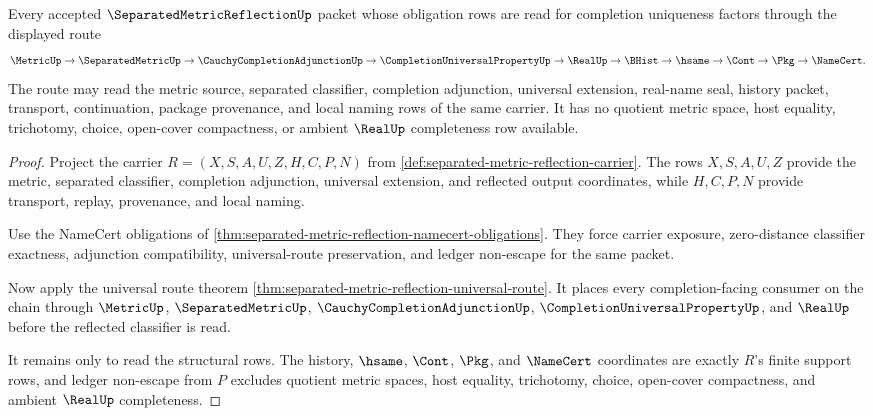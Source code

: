 \begin{theorem}
\label{thm:separated-metric-reflection-scope}
Every accepted $\SeparatedMetricReflectionUp$ packet whose obligation rows are read for completion uniqueness factors through the displayed route
$$
\MetricUp\to\SeparatedMetricUp\to\CauchyCompletionAdjunctionUp\to\CompletionUniversalPropertyUp\to\RealUp\to\BHist\to\hsame\to\Cont\to\Pkg\to\NameCert .
$$
The route may read the metric source, separated classifier, completion adjunction, universal extension, real-name seal, history packet, transport, continuation, package provenance, and local naming rows of the same carrier. It has no quotient metric space, host equality, trichotomy, choice, open-cover compactness, or ambient $\RealUp$ completeness row available.
\end{theorem}
\begin{proof}
Project the carrier $R=(X,S,A,U,Z,H,C,P,N)$ from \autoref{def:separated-metric-reflection-carrier}. The rows $X,S,A,U,Z$ provide the metric, separated classifier, completion adjunction, universal extension, and reflected output coordinates, while $H,C,P,N$ provide transport, replay, provenance, and local naming.

Use the NameCert obligations of \autoref{thm:separated-metric-reflection-namecert-obligations}. They force carrier exposure, zero-distance classifier exactness, adjunction compatibility, universal-route preservation, and ledger non-escape for the same packet.

Now apply the universal route theorem \autoref{thm:separated-metric-reflection-universal-route}. It places every completion-facing consumer on the chain through $\MetricUp$, $\SeparatedMetricUp$, $\CauchyCompletionAdjunctionUp$, $\CompletionUniversalPropertyUp$, and $\RealUp$ before the reflected classifier is read.

It remains only to read the structural rows. The history, $\hsame$, $\Cont$, $\Pkg$, and $\NameCert$ coordinates are exactly $R$'s finite support rows, and ledger non-escape from $P$ excludes quotient metric spaces, host equality, trichotomy, choice, open-cover compactness, and ambient $\RealUp$ completeness.
\end{proof}


